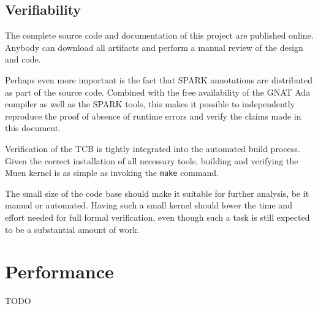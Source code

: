 \subsection{Verifiability}
The complete source code and documentation of this project are published online.
Anybody can download all artifacts and perform a manual review of the design and
code.

Perhaps even more important is the fact that SPARK annotations are distributed
as part of the source code. Combined with the free availability of the GNAT Ada
compiler as well as the SPARK tools, this makes it possible to independently
reproduce the proof of absence of runtime errors and verify the claims made in
this document.

Verification of the TCB is tightly integrated into the automated build process.
Given the correct installation of all necessary tools, building and verifying
the Muen kernel is as simple as invoking the \texttt{make} command.

The small size of the code base should make it suitable for further analysis, be
it manual or automated. Having such a small kernel should lower the time and
effort needed for full formal verification, even though such a task is still
expected to be a substantial amount of work.

\section{Performance}
TODO

